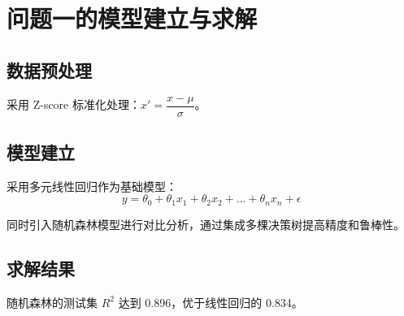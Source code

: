 \section{问题一的模型建立与求解}

\subsection{数据预处理}

采用 Z-score 标准化处理：$x' = \dfrac{x - \mu}{\sigma}$。

\subsection{模型建立}

采用多元线性回归作为基础模型：
\[
  y = \theta_0 + \theta_1 x_1 + \theta_2 x_2 + \dots + \theta_n x_n + \epsilon
\]

同时引入随机森林模型进行对比分析，通过集成多棵决策树提高精度和鲁棒性。

\subsection{求解结果}

随机森林的测试集 $R^2$ 达到 0.896，优于线性回归的 0.834。
